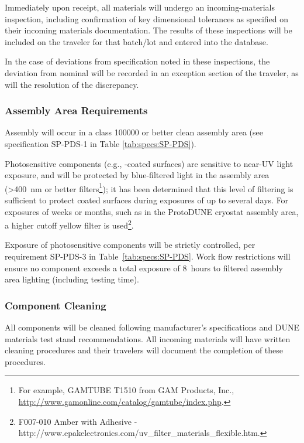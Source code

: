 Immediately upon receipt, all materials will undergo an incoming-materials inspection, including confirmation of key dimensional tolerances as specified on their incoming materials documentation.  
The results of these inspections will be included on the traveler for that batch/lot and entered into the database.

In the case of deviations from specification noted in these inspections, the deviation from nominal will be recorded in an exception section of the traveler, as will the resolution of the discrepancy.

\subsubsection{Assembly Area Requirements}

Assembly will occur in a class \num{100000} or better clean assembly area (see specification SP-PDS-1 in Table \ref{tab:specs:SP-PDS}).  

%

Photosensitive components (e.g., -coated surfaces) are sensitive to near-UV light exposure, and will be protected by blue-filtered light in the assembly area (>\SI{400}{nm} or better filters\footnote{For example, GAMTUBE T1510\texttrademark{} from GAM Products, Inc., \url{http://www.gamonline.com/catalog/gamtube/index.php}.}); it has been determined that this level of filtering is sufficient to protect coated surfaces during  exposures of up to several days. For exposures of weeks or months, such as in the ProtoDUNE cryostat assembly area, a higher cutoff yellow filter is used\footnote{F007-010\texttrademark{} Amber with Adhesive - http://www.epakelectronics.com/uv\_filter\_materials\_flexible.htm.}. 


Exposure of photosensitive components will be strictly controlled, per requirement SP-PDS-3 in Table~\ref{tab:specs:SP-PDS}.  
Work flow restrictions will %
ensure no component exceeds a total exposure of \SI{8}{hours} to filtered assembly area lighting (including testing time).

\subsubsection{Component Cleaning}
\label{sssec:cleaning}
All components will be cleaned 
following manufacturer's specifications and DUNE materials test stand recommendations.  %
All incoming materials will have written cleaning procedures and their travelers will document the completion of these procedures.

